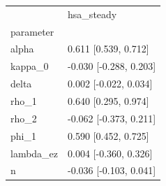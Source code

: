 \begin{tabular}{ll}
\toprule
 & hsa\_steady \\
parameter &  \\
\midrule
alpha & 0.611 [0.539, 0.712] \\
kappa\_0 & -0.030 [-0.288, 0.203] \\
delta & 0.002 [-0.022, 0.034] \\
rho\_1 & 0.640 [0.295, 0.974] \\
rho\_2 & -0.062 [-0.373, 0.211] \\
phi\_1 & 0.590 [0.452, 0.725] \\
lambda\_ez & 0.004 [-0.360, 0.326] \\
n & -0.036 [-0.103, 0.041] \\
\bottomrule
\end{tabular}
